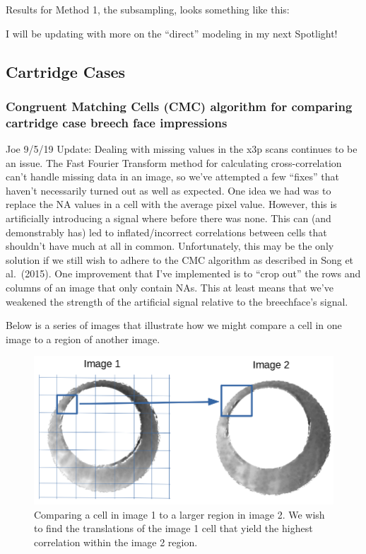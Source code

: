 \documentclass[]{book}
\begin{document}
Results for Method 1, the subsampling, looks something like this:

I will be updating with more on the ``direct'' modeling in my next Spotlight!

\hypertarget{cartridge-cases}{%
\subsection{Cartridge Cases}\label{cartridge-cases}}

\hypertarget{congruent-matching-cells-cmc-algorithm-for-comparing-cartridge-case-breech-face-impressions}{%
\subsubsection{Congruent Matching Cells (CMC) algorithm for comparing cartridge case breech face impressions}\label{congruent-matching-cells-cmc-algorithm-for-comparing-cartridge-case-breech-face-impressions}}

Joe 9/5/19 Update: Dealing with missing values in the x3p scans continues to be an issue. The Fast Fourier Transform method for calculating cross-correlation can't handle missing data in an image, so we've attempted a few ``fixes'' that haven't necessarily turned out as well as expected. One idea we had was to replace the NA values in a cell with the average pixel value. However, this is artificially introducing a signal where before there was none. This can (and demonstrably has) led to inflated/incorrect correlations between cells that shouldn't have much at all in common. Unfortunately, this may be the only solution if we still wish to adhere to the CMC algorithm as described in Song et al.~(2015). One improvement that I've implemented is to ``crop out'' the rows and columns of an image that only contain NAs. This at least means that we've weakened the strength of the artificial signal relative to the breechface's signal.

Below is a series of images that illustrate how we might compare a cell in one image to a region of another image.

\begin{figure}

{\centering \includegraphics[width=0.5\linewidth]{images/cartridge_cases/im1_im2_cellComparison} 

}

\caption{Comparing a cell in image 1 to a larger region in image 2. We wish to find the translations of the image 1 cell that yield the highest correlation within the image 2 region.}\label{fig:unnamed-chunk-15}
\end{figure}
\end{document}
